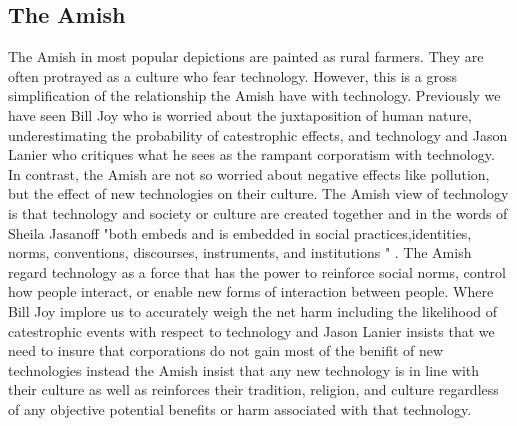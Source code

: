 \subsection{The Amish}
  The Amish in most popular depictions are painted as rural farmers. They are often protrayed as a culture who fear technology. However, this is a gross simplification of the relationship the Amish have with technology. Previously we have seen Bill Joy who is worried about the juxtaposition of human nature, underestimating the probability of catestrophic effects, and technology and Jason Lanier who critiques what he sees as the rampant corporatism with technology. In contrast, the Amish are not so worried about negative effects like pollution, but the effect of new technologies on their culture. The Amish view of technology is that technology and society or culture are created together and in the words of Sheila Jasanoff "both embeds and is embedded in social practices,identities, norms, conventions, discourses, instruments, and institutions " \cite{wetmore2007amish}. The Amish regard technology as a force that has the power to reinforce social norms, control how people interact, or enable new forms of interaction between people. Where Bill Joy implore us to accurately weigh the net harm including the likelihood of catestrophic events with respect to technology and Jason Lanier insists that we need to insure that corporations do not gain most of the benifit of new technologies instead the Amish insist that any new technology is in line with their culture as well as reinforces their tradition, religion, and culture regardless of any objective potential benefits or harm associated with that technology. 
\label{sec:-amish}

